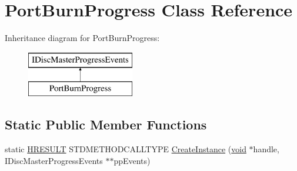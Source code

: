 \hypertarget{class_port_burn_progress}{}\section{Port\+Burn\+Progress Class Reference}
\label{class_port_burn_progress}
Inheritance diagram for Port\+Burn\+Progress\+:\begin{figure}[H]
\begin{center}
\leavevmode
\includegraphics[height=2.000000cm]{class_port_burn_progress}
\end{center}
\end{figure}
\subsection*{Static Public Member Functions}
\begin{DoxyCompactItemize}
\item 
static \hyperlink{px__win__ds_8c_a6ad46d30b0323d7b029e41f32f8a2571}{H\+R\+E\+S\+U\+LT} S\+T\+D\+M\+E\+T\+H\+O\+D\+C\+A\+L\+L\+T\+Y\+PE \hyperlink{class_port_burn_progress_aaac0e67d96f30e496ef06f3ea5115cab}{Create\+Instance} (\hyperlink{sound_8c_ae35f5844602719cf66324f4de2a658b3}{void} $\ast$handle, I\+Disc\+Master\+Progress\+Events $\ast$$\ast$pp\+Events)
\end{DoxyCompactItemize}
